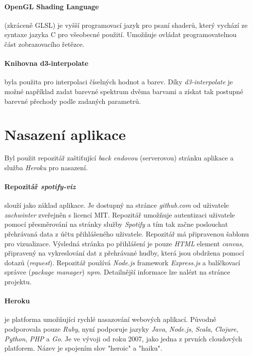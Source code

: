\documentclass[thesis=B, czech]{FITthesis}[2019/03/06]
\begin{document}
\paragraph*{OpenGL Shading Language}

(zkráceně GLSL) je vyšší programovací jazyk pro psaní shaderů, který vychází ze syntaxe jazyka C pro všeobecné použití. Umožňuje ovládat programovatelnou část zobrazovacího řetězce.

\paragraph*{Knihovna d3-interpolate}

byla použita pro interpolaci číselných hodnot a barev. Díky \textit{d3-interpolate} je možné například zadat barevné spektrum dvěma barvami a získat tak postupné barevné přechody podle zadaných parametrů.

\section {Nasazení aplikace}

Byl použit repozitář zaštiťující \textit{back endovou} (serverovou) stránku aplikace a služba \textit{Heroku} pro nasazení.

\paragraph*{Repozitář \textit{spotify-viz}}

slouží jako základ aplikace. Je dostupný na stránce \textit{github.com} od uživatele \textit{zachwinter} zveřejněn s licencí MIT. Repozitář umožňuje autentizaci uživatele pomocí přesměrování na stránky služby \textit{Spotify} a tím tak začne poslouchat přehrávaná data z účtu přihlášeného uživatele. Repozitář má připravenou šablonu pro vizualizace. Výsledná stránka po přihlášení je pouze \textit{HTML} element \textit{canvas}, připravený na vykreslování dat z přehrávané hudby, která jsou obdržena pomocí dotazů (\textit{request}). Repozitář používá \textit{Node.js} framework \textit{Express.js} a balíčkovací správce (\textit{package manager}) \textit{npm}. Detailnější informace lze nalézt na stránce\cite{spotifyViz} projektu.


\paragraph*{Heroku}

je platforma umožňující rychlé nasazování webových aplikací. Původně podporovala pouze \textit{Ruby}, nyní podporuje jazyky \textit{Java}, \textit{Node.js}, \textit{Scala}, \textit{Clojure}, \textit{Python}, \textit{PHP} a \textit{Go}. Je ve vývoji od roku 2007, jako jedna z prvních cloudových platforem. Název je spojením slov "heroic" a "haiku".
\end{document}
